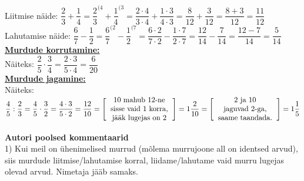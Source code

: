\begin{center}
{{{\begin{flushleft}
\vspace{5mm}
\hspace{5mm} Liitmise näide: $\dfrac{2}{3}+\dfrac{1}{4}={\dfrac{2}{3}}^{(4}+\dfrac{1}{4}^{(3}=\dfrac{2 \cdot 4}{3 \cdot 4}+\dfrac{1 \cdot 3}{4 \cdot 3}=\dfrac{8}{12}+\dfrac{3}{12}=\dfrac{8+3}{12}=\dfrac{11}{12}$\\
\vspace{5mm}
\hspace{5mm} Lahutamise näide: $\dfrac{6}{7}-\dfrac{1}{2} = {\dfrac{6}{7}}^{(2}-{\dfrac{1}{2}}^{(7}= \dfrac{6 \cdot 2}{7 \cdot 2}-\dfrac{1 \cdot 7}{2 \cdot 7}=\dfrac{12}{14}-\dfrac{7}{14}=\dfrac{12-7}{14}=\dfrac{5}{14}$\\
\vspace{5mm}
\hspace{5mm} \textbf{\underline{Murdude korrutamine:}} \\
\vspace{5mm}
\hspace{5mm} Näiteks: $\dfrac{2}{5} \cdot \dfrac{3}{4} = \dfrac{2 \cdot 3}{5 \cdot 4 } = \dfrac{6}{20}$\\
\vspace{5mm}
\hspace{5mm} \textbf{\underline{Murdude jagamine:}} \\
\vspace{5mm}
\hspace{5mm} Näiteks: $\dfrac{4}{5}:\dfrac{2}{3}=\dfrac{4}{5} \cdot \dfrac{3}{2}=\dfrac{4 \cdot 3}{5 \cdot 2}= \dfrac{12}{10}= \Bigg[ \begin{tabular}{c}
10 mahub 12-ne\\
sisse vaid 1 korra,\\
jääk lugejas on 2
\end{tabular} \Bigg] = 1\dfrac{2}{10}= \Bigg[ \begin{tabular}{c}
2 ja 10\\
jaguvad 2-ga,\\
saame taandada.
\end{tabular} \Bigg]=1\dfrac{1}{5}$
\end{flushleft}
}}}
\end{center}

\newpage

\textbf{Autori poolsed kommentaarid}\\

1) Kui meil on ühenimelised murrud (mõlema murrujoone all on identsed arvud), siis murdude liitmise/lahutamise korral, liidame/lahutame vaid murru lugejas olevad arvud. Nimetaja jääb samaks.\\

